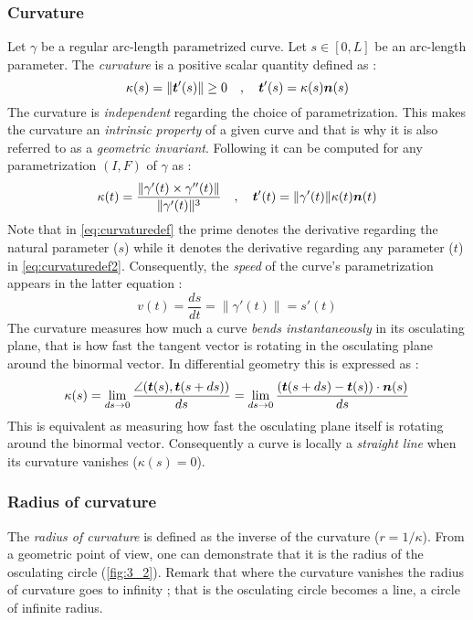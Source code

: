 \subsubsection{Curvature}
Let $\gamma$ be a regular arc-length parametrized curve. Let $s \in [0,L]$ be an arc-length parameter. The \emph{curvature} is a positive scalar quantity defined as :
\begin{equation}
	\kappa(s) = \|\boldsymbol{t}'(s)\| \ge 0 
	\quad,\quad
	\boldsymbol{t}'(s) = \kappa(s) \boldsymbol{n}(s)
\label{eq:curvaturedef}
\end{equation}
The curvature is \emph{independent} regarding the choice of parametrization. This makes the curvature an \emph{intrinsic property} of a given curve and that is why it is also referred to as a \emph{geometric invariant}. Following \cite[pp.203-204]{Gray2006} it can be computed for any parametrization $(I,F)$ of $\gamma$ as :
\begin{equation}
	\kappa(t) = \frac{\|\gamma'(t) \times \gamma''(t) \|}{\|\gamma'(t)\|^3}
	\quad,\quad
	\boldsymbol{t}'(t) = \|\gamma'(t)\| \kappa(t) \boldsymbol{n}(t)
\label{eq:curvaturedef2}
\end{equation}
Note that in \cref{eq:curvaturedef} the prime denotes the derivative regarding the natural parameter ($s$) while it denotes the derivative regarding any parameter ($t$) in \cref{eq:curvaturedef2}. Consequently, the \emph{speed} of the curve's parametrization appears in the latter equation :
\begin{equation}
	v(t) = \frac{ds}{dt} = \|\gamma'(t)\| = s'(t)
\end{equation}
The curvature measures how much a curve \emph{bends instantaneously} in its osculating plane, that is how fast the tangent vector is rotating in the osculating plane around the binormal vector. In differential geometry this is expressed as :
\begin{equation}
	\kappa(s)
	= \lim_{ds \to 0}\frac{\angle(\boldsymbol{t}(s),\boldsymbol{t}(s+ds))}{ds}
	= \lim_{ds \to 0}\frac{(\boldsymbol{t}(s+ds) - \boldsymbol{t}(s)) \cdot \boldsymbol{n}(s)}{ds}
\end{equation}
This is equivalent as measuring how fast the osculating plane itself is rotating around the binormal vector. Consequently a curve is locally a \emph{straight line} when its curvature vanishes ($\kappa(s)= 0$).

\subsubsection{Radius of curvature}
The \emph{radius of curvature} is defined as the inverse of the curvature ($r= 1/\kappa$). From a geometric point of view, one can demonstrate that it is the radius of the osculating circle (\cref{fig:3_2}). Remark that where the curvature vanishes the radius of curvature goes to infinity ; that is the osculating circle becomes a line, a circle of infinite radius.

